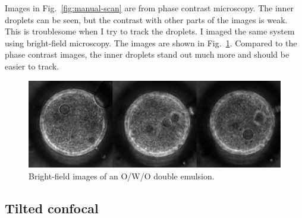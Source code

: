 \documentclass[onecolumn,aps, pre,amsmath,amssymb,longbibliography,11pt]{revtex4-2}
\begin{document}
Images in Fig.~\ref{fig:manual-scan} are from phase contrast microscopy.
The inner droplets can be seen, but the contrast with other parts of the images is weak.
This is troublesome when I try to track the droplets.
I imaged the same system using bright-field microscopy.
The images are shown in Fig.~\ref{fig:bright-field-images}.
Compared to the phase contrast images, the inner droplets stand out much more and should be easier to track.

\begin{figure}[h]
  \includegraphics{bright-field-images.png}
  \caption{Bright-field images of an O/W/O double emulsion.}
  \label{fig:bright-field-images}
\end{figure}


\subsection{Tilted confocal}
\end{document}
